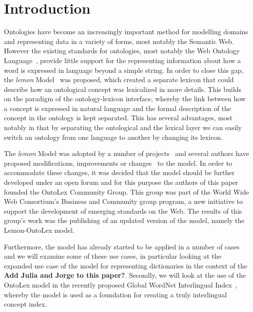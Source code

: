 \documentclass[12pt,a4paper]{elex2017}
\begin{document}

\section{Introduction}

Ontologies have become an increasingly important method for modelling domains and
representing data in a variety of forms, most notably the Semantic Web. However
the existing standards for ontologies, most notably the Web Ontology
Language~\citep[OWL]{mcguinness2004ow}, provide little support for the
representing information about how a word is expressed in language beyond a
simple string. In order to close this gap, the \emph{lemon}
Model~\citep{mccrae2012interchanging} was proposed, which created a separate
lexicon that could describe how an ontological concept was lexicalized in more
details. This builds on the paradigm of the ontology-lexicon interface, whereby
the link between how a concept is expressed in natural language and the formal
description of the concept in the ontology is kept separated. This has several
advantages, most notably in that by separating the ontological and the lexical
layer we can easily switch an ontology from one language to another by changing
its lexicon. 

The \emph{lemon} Model was adopted by a number of
projects~\citep{navigli2012babelnet,serasset2015dbnary,ecklekohler2015} and
several authors have proposed modifications, improvements or
changes~\citep{khan2014using,chavula2014lemon,bosque2016linked}
to the model. In order to accommodate these changes, it was decided that the
model should be further developed under an open forum and for this purpose the
authors of this paper founded the OntoLex Community Group. This group was part
of the World Wide Web Consortium's Business and Community group program, a new
initiative to support the development of emerging standards on the Web. The
results of this group's work was the publishing of an updated version of the
model, namely the Lemon-OntoLex model.

Furthermore, the model has already started to be applied in a number of cases
and we will examine some of these use cases, in particular looking at the
expanded use case of the model for representing dictionaries in the context of
the \textbf{Add Julia and Jorge to this paper?}. Secondly, we will look at the
use of the OntoLex model in the recently proposed Global WordNet Interlingual
Index~\citep{vossen2016toward,bond2016cili}, whereby the model is used as a
foundation for creating a truly interlingual concept index.
\end{document}

